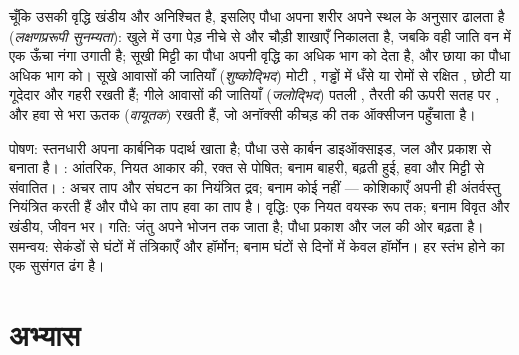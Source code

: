 \begin{proposition}[रूप स्थल के अनुसार चलता है]\label{prop:b1:flowering-plant-organization:plasticity}
चूँकि उसकी वृद्धि खंडीय और अनिश्चित है, इसलिए पौधा अपना शरीर अपने स्थल
के अनुसार ढालता है (\emph{लक्षणप्ररूपी सुनम्यता}):
खुले में उगा पेड़ नीचे से और चौड़ी शाखाएँ निकालता है, जबकि वही जाति वन
में एक ऊँचा नंगा  उगाती है; सूखी मिट्टी का पौधा अपनी वृद्धि का अधिक
भाग  को देता है, और छाया का पौधा अधिक भाग  को। सूखे आवासों
की जातियाँ (\emph{शुष्कोद्भिद}) मोटी , गड्ढों
में धँसे या रोमों से रक्षित , छोटी या गूदेदार  और गहरी
 रखती हैं; गीले आवासों की जातियाँ
(\emph{जलोद्भिद}) पतली , तैरती  की ऊपरी
सतह पर , और हवा से भरा ऊतक (\emph{वायूतक}) रखती हैं,
जो अनॉक्सी कीचड़ की  तक ऑक्सीजन पहुँचाता है।
\end{proposition}

\begin{example}\label{ex:b1:flowering-plant-organization:comparison}
पोषण: स्तनधारी अपना कार्बनिक पदार्थ खाता है; पौधा उसे कार्बन डाइऑक्साइड, जल
और प्रकाश से बनाता है। : आंतरिक, नियत आकार की, रक्त से
पोषित; बनाम बाहरी, बढ़ती हुई, हवा और मिट्टी से संवातित। : अचर ताप और संघटन का नियंत्रित द्रव; बनाम कोई नहीं --- कोशिकाएँ
अपनी ही अंतर्वस्तु नियंत्रित करती हैं और पौधे का ताप हवा का ताप है।
वृद्धि: एक नियत वयस्क रूप तक; बनाम विवृत और खंडीय, जीवन भर। गति: जंतु
अपने भोजन तक जाता है; पौधा प्रकाश और जल की ओर बढ़ता है। समन्वय:
सेकंडों से घंटों में तंत्रिकाएँ और हॉर्मोन; बनाम घंटों से दिनों में
केवल हॉर्मोन। हर स्तंभ  होने का एक सुसंगत ढंग है।
\end{example}

\section{अभ्यास}

